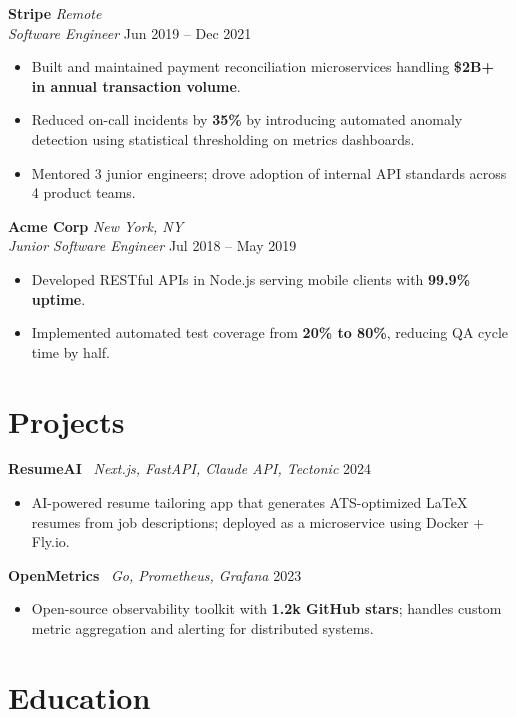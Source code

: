 \documentclass[10pt, letterpaper]{article}
\newcommand{\jobentry}[4]{%
  \vspace{4pt}
  \textbf{#1} \hfill \textit{#3} \\
  \textit{#2} \hfill \small{#4}
  \vspace{1pt}
}
\newcommand{\projectentry}[3]{%
  \vspace{4pt}
  \textbf{#1} \textbar\ \textit{#2} \hfill \small{#3}
  \vspace{1pt}
}
\begin{document}
\jobentry{Stripe}{Software Engineer}{Remote}{Jun 2019 -- Dec 2021}
\begin{itemize}
  \item Built and maintained payment reconciliation microservices handling
        \textbf{\$2B+ in annual transaction volume}.
  \item Reduced on-call incidents by \textbf{35\%} by introducing automated anomaly detection
        using statistical thresholding on metrics dashboards.
  \item Mentored 3 junior engineers; drove adoption of internal API standards
        across 4 product teams.
\end{itemize}

\jobentry{Acme Corp}{Junior Software Engineer}{New York, NY}{Jul 2018 -- May 2019}
\begin{itemize}
  \item Developed RESTful APIs in Node.js serving mobile clients with \textbf{99.9\% uptime}.
  \item Implemented automated test coverage from \textbf{20\% to 80\%}, reducing QA
        cycle time by half.
\end{itemize}

\section{Projects}

\projectentry{ResumeAI}{Next.js, FastAPI, Claude API, Tectonic}{2024}
\begin{itemize}
  \item AI-powered resume tailoring app that generates ATS-optimized LaTeX resumes
        from job descriptions; deployed as a microservice using Docker + Fly.io.
\end{itemize}

\projectentry{OpenMetrics}{Go, Prometheus, Grafana}{2023}
\begin{itemize}
  \item Open-source observability toolkit with \textbf{1.2k GitHub stars}; handles custom
        metric aggregation and alerting for distributed systems.
\end{itemize}

\section{Education}
\end{document}
